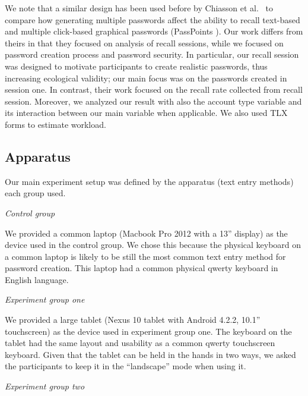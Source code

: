 \documentclass[conference]{IEEEtran}
\begin{document}
We note that a similar design has been used before by Chiasson et al.~\cite{Chiasson:2009:MPI:1653662.1653722} to compare how generating multiple passwords affect the ability to recall text-based and multiple click-based graphical passwords (PassPoints \cite{Wiedenbeck:2005:PDL:1090412.1090418}). Our work differs from theirs in that they focused on analysis of recall sessions, while we focused on password creation process and password security. In particular, our recall session was designed to motivate participants to create realistic passwords, thus increasing ecological validity; our main focus was on the passwords created in session one. In contrast, their work focused on the recall rate collected from recall session. Moreover, we analyzed our result with also the account type variable and its interaction between our main variable when applicable. We also used TLX forms to estimate workload.

\subsection{Apparatus}


Our main experiment setup was defined by the apparatus (text entry methods) each group used. 

\textit{Control group} 

We provided a common laptop (Macbook Pro 2012 with a 13'' display) as the device used in the control group.  We chose this because the physical keyboard on a common laptop is likely to be still the most common text entry method for password creation. This laptop had a common physical qwerty keyboard in English language.

\textit{Experiment group one} 

We provided a large tablet (Nexus 10 tablet with Android 4.2.2, 10.1'' touchscreen) as the device used in experiment group one. The keyboard on the tablet had the same layout and usability as a common qwerty touchscreen keyboard. Given that the tablet can be held in the hands in two ways, we asked the participants to keep it in the ``landscape'' mode when using it.

\textit{Experiment group two} 
\end{document}
